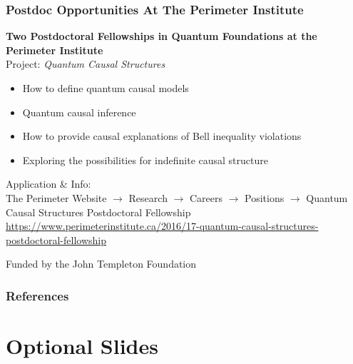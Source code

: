 \documentclass[
    hyperref={bookmarks=false},%
    xcolor={dvipsnames},
]{beamer}
\begin{document}
\begin{frame}
    \frametitle{Postdoc Opportunities At The Perimeter Institute}
    \begin{center}
    \textbf{Two Postdoctoral Fellowships in Quantum Foundations at the Perimeter Institute} \\
    Project: \textit{Quantum Causal Structures} \\
    \vfill
    \begin{itemize}
        \item How to define quantum causal models
        \item Quantum causal inference
        \item How to provide causal explanations of Bell inequality violations
        \item Exploring the possibilities for indefinite causal structure
    \end{itemize}
    \vfill
    {\scriptsize Application \& Info:}\\

    The Perimeter Website $\to$ Research $\to$ Careers $\to$ Positions $\to$ Quantum Causal Structures Postdoctoral Fellowship
    \textcolor{blue}{\url{https://www.perimeterinstitute.ca/2016/17-quantum-causal-structures-postdoctoral-fellowship}}
    \vfill

    {\scriptsize Funded by the John Templeton Foundation}
    \end{center}

\end{frame}

\begin{frame}[allowframebreaks]
    \frametitle{References}
    \printbibliography
\end{frame}

\section{Optional Slides}
\end{document}
